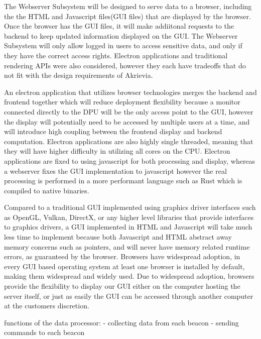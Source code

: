 \bigskip
The Webserver Subsystem will be designed to serve data to a browser, including the the HTML and Javascript files(GUI files) that are displayed by the browser.
Once the browser has the GUI files, it will make addiitonal requests to the backend to keep updated information displayed on the GUI.
The Webserver Subsystem will only allow logged in users to access sensitive data, and only if they have the correct access rights.
Electron applications and traditional rendering APIs were also considered, however they each have tradeoffs that do not fit with the design requirements of Akrievia.

\bigskip
An electron application that utilizes browser technologies merges the backend and frontend together which will reduce deployment flexibility because a monitor connected directly to the DPU will be the only access point to the GUI, however the display will potentially need to be accessed by multiple users at a time, and will introduce high coupling between the frontend display and backend computation.
Electron applications are also highly single threaded, meaning that they will have higher difficulty in utilizing all cores on the CPU.
Electron applications are fixed to using javascript for both processing and display, whereas a webserver fixes the GUI implementation to javascript however the real processing is performed in a more performant language such as Rust which is compiled to native binaries.

\bigskip
Compared to a traditional GUI implemented using graphics driver interfaces such as OpenGL, Vulkan, DirectX, or any higher level libraries that provide interfaces to graphics drivers, a GUI implemented in HTML and Javascript will take much less time to implement because both Javascript and HTML abstract away memory concerns such as pointers, and will never have memory related runtime errors, as guaranteed by the browser.
Browsers have widespread adoption, in every GUI based operating system at least one browser is installed by default, making them widespread and widely used.
Due to widespread adoption, browsers provide the flexibility to display our GUI either on the computer hosting the server itself, or just as easily the GUI can be accessed through another computer at the customers discretion.


functions of the data processor:
	- collecting data from each beacon
	- sending commands to each beacon

\bigskip
